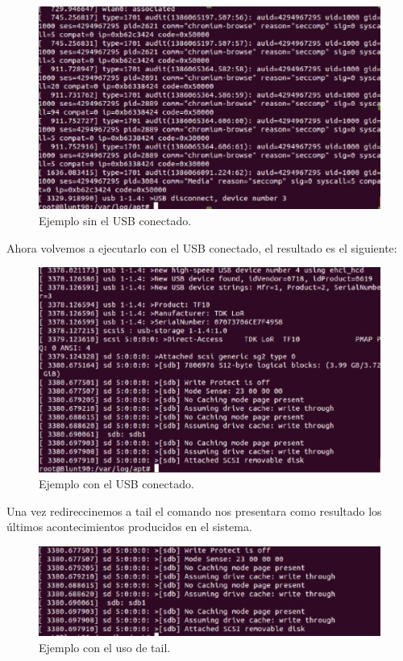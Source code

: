 \begin{figure}[H]
\begin{center}
\includegraphics[scale=0.6]{imagenes/ejercicio3-1.eps}
\caption{Ejemplo sin el USB conectado.}
\end{center}
\end{figure}

Ahora volvemos a ejecutarlo con el USB conectado, el resultado es el siguiente:


\begin{figure}[H]
\begin{center}
\includegraphics[scale=0.6]{imagenes/ejercicio3-2.eps}
\caption{Ejemplo con el USB conectado.}
\end{center}
\end{figure}

Una vez redireccinemos a tail el comando nos presentara como resultado los últimos acontecimientos producidos en el sistema.

\begin{figure}[H]
\begin{center}
\includegraphics[scale=0.6]{imagenes/ejercicio3-3.eps}
\caption{Ejemplo con el uso de tail.}
\end{center}
\end{figure}

